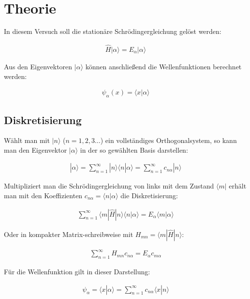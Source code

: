 
\section{Theorie}
\label{sec:theorie}

In diesem Versuch soll die stationäre Schrödingergleichung gelöst werden:

\begin{align}
  \hat H | \alpha \rangle = E_\alpha | \alpha \rangle
\end{align}

Aus den Eigenvektoren $| \alpha \rangle$ können anschließend die
Wellenfunktionen berechnet werden:

\begin{align}
  \psi_\alpha(x) = \langle x | \alpha \rangle
\end{align}

\subsection{Diskretisierung}
\label{sec:diskretisierung}

Wählt man mit $| n \rangle$ ($n = 1,2,3 \dots$) ein vollständiges
Orthogonalsystem, so kann man den Eigenvektor $| \alpha \rangle$ in der
so gewählten Basis darstellen:

\begin{align}
  | \alpha \rangle = \sum_{n=1}^\infty | n \rangle \langle n | \alpha
  \rangle = \sum_{n=1}^\infty c_{n \alpha} | n \rangle
\end{align}

Multipliziert man die Schrödingergleichung von links mit dem Zustand
$\langle m |$ erhält man mit den Koeffizienten $c_{n \alpha} = \langle
n | \alpha \rangle$ die Diskretisierung:

\begin{align}
  \sum_{n = 1}^\infty \langle m | \hat H | n \rangle \langle n |
  \alpha \rangle = E_\alpha \langle m | \alpha \rangle
\end{align}

Oder in kompakter Matrix-schreibweise mit $H_{m n} = \langle m | \hat
H | n \rangle$:

\begin{align}
  \sum_{n = 1}^\infty H_{m n} c_{n \alpha} = E_\alpha c_{m \alpha}
\end{align}

Für die Wellenfunktion gilt in dieser Darstellung:

\begin{align}
  \psi_\alpha = \langle x | \alpha \rangle = \sum_{n=1}^\infty c_{n
    \alpha} \langle x | n \rangle
\end{align}

